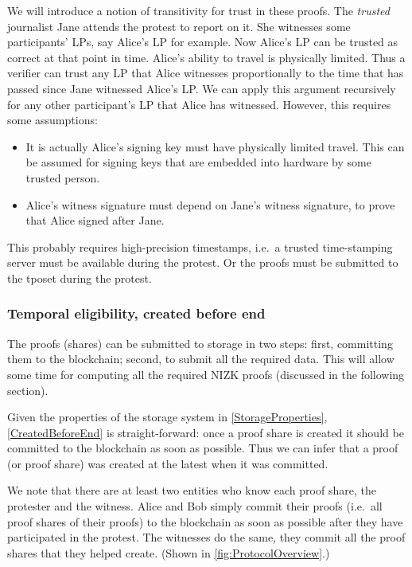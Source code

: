 We will introduce a notion of transitivity for trust in these proofs.
The \emph{trusted} journalist Jane attends the protest to report on it.
She witnesses some participants' \acp{LP}, say Alice's \ac{LP} for example.
Now Alice's \ac{LP} can be trusted as correct at that point in time.
Alice's ability to travel is physically limited.
Thus a verifier can trust any \ac{LP} that Alice witnesses proportionally to 
the time that has passed since Jane witnessed Alice's \ac{LP}.
We can apply this argument recursively for any other participant's \ac{LP} that 
Alice has witnessed.
However, this requires some assumptions:
\begin{itemize}
  \item It is actually Alice's signing key must have physically limited travel.
    This can be assumed for signing keys that are embedded into hardware by 
    some trusted person.
  \item Alice's witness signature must depend on Jane's witness signature, to 
    prove that Alice signed after Jane.
\end{itemize}
\begin{remark}
  This probably requires high-precision timestamps, i.e.\ a trusted 
  time-stamping server must be available during the protest.
  Or the proofs must be submitted to the \ac{tposet} during the protest.
\end{remark}

\subsubsection{Temporal eligibility, created before end}

The proofs (shares) can be submitted to storage in two steps:
first, committing them to the blockchain; second, to submit all the required 
data.
This will allow some time for computing all the required \ac{NIZK} proofs 
(discussed in the following section).

Given the properties of the storage system in \cref{StorageProperties}, 
\cref{CreatedBeforeEnd} is straight-forward: once a proof share is created it 
should be committed to the blockchain as soon as possible.
Thus we can infer that a proof (or proof share) was created at the latest when 
it was committed.

We note that there are at least two entities who know each proof share, the 
protester and the witness.
Alice and Bob simply commit their proofs (i.e.\ all proof shares of their 
proofs) to the blockchain as soon as possible after they have participated in 
the protest.
The witnesses do the same, they commit all the proof shares that they helped 
create.
(Shown in \cref{fig:ProtocolOverview}.)


